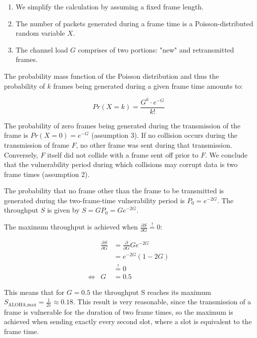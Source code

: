 \smallskip

\begin{enumerate}
	\item We simplify the calculation by assuming a fixed frame length.
	\item The number of packets generated during a frame time is a Poisson-distributed random variable $X$.
	\item The channel load $G$ comprises of two portions: "new" and retransmitted frames.
\end{enumerate}

The probability mass function of the Poisson distribution and thus the probability of $k$ frames being generated during a given frame time amounts to:

\begin{equation}
	Pr(X=k) = \frac{G^k\cdot e^{-G}}{k!}
\end{equation}

The probability of zero frames being generated during the transmission of the frame is $Pr(X=0) = e^{-G}$ (assumption 3). If no collision occurs during the transmission of frame $F$, no other frame was sent during that transmission. Conversely, $F$ itself did not collide with a frame sent off prior to $F$. We conclude that the vulnerability period during which collisions may corrupt data is two frame times (assumption 2).

The probability that no frame other than the frame to be transmitted is generated during the two-frame-time vulnerability period is $P_0 = e^{-2G}$. The throughput $S$ is given by $S=GP_0 = Ge^{-2G}$.

The maximum throughput is achieved when $\frac{\partial S}{\partial G} \stackrel{!}{=} 0$:

\begin{eqnarray}
	& \frac{\partial S}{\partial G} & = \frac{\partial}{\partial G} Ge^{-2G} \\ 
	& & = e^{-2G}(1-2G) \\
	& & \stackrel{!}{=} 0 \\
	\Leftrightarrow & G & = 0.5
\end{eqnarray}
	
This means that for $G=0.5$ the throughput S reaches its maximum $S_\text{ALOHA,max} = \frac{1}{2e} \approx 0.18$. This result is very reasonable, since the transmission of a frame is vulnerable for the duration of two frame times, so the maximum is achieved when sending exactly every second slot, where a slot is equivalent to the frame time.

